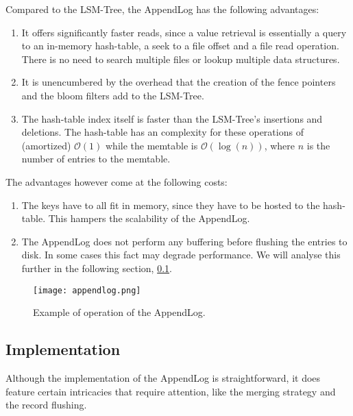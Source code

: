 Compared to the LSM-Tree, the AppendLog has the following advantages:
\begin{enumerate}
    \item It offers significantly faster reads, since a value retrieval is essentially a query to an in-memory hash-table, a seek to a file offset and a file read operation. There is no need to search multiple files or lookup multiple data structures.
    \item It is unencumbered by the overhead that the creation of the fence pointers and the bloom filters add to the LSM-Tree.
    \item The hash-table index itself is faster than the LSM-Tree's insertions and deletions. The hash-table has an complexity for these operations of (amortized) $\mathcal{O}(1)$ while the memtable is $\mathcal{O}(\log{}(n))$, where $n$ is the number of entries to the memtable.
\end{enumerate}

The advantages however come at the following costs:
\begin{enumerate}
    \item The keys have to all fit in memory, since they have to be hosted to the hash-table. This hampers the scalability of the AppendLog.
    \item The AppendLog does not perform any buffering before flushing the entries to disk. In some cases this fact may degrade performance. We will analyse this further in the following section, \ref{appendlog-implementation}.
\end{enumerate}



\begin{figure}[h]
    \centering
    \texttt{[image: appendlog.png]}
    \caption{Example of operation of the AppendLog.}
    \label{fig:appendlog}
\end{figure}

\subsection{Implementation}
\label{appendlog-implementation}

Although the implementation of the AppendLog is straightforward, it does feature certain intricacies that require attention, like the merging strategy and the record flushing.

